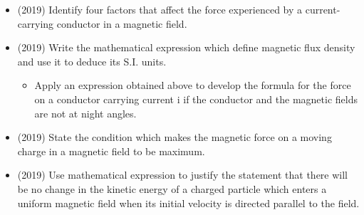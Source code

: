 \documentclass{article}
\begin{document}
\begin{itemize}
\begin{itemize}
\end{itemize}
\item (2019)  Identify four factors that affect the force experienced by a current-carrying conductor in a magnetic field. 
\item (2019)  Write the mathematical expression which define magnetic flux density and use it to deduce its S.I. units. 
 \begin{itemize}
\item Apply an expression obtained above to develop the formula for the force on a conductor carrying current i if the conductor and the magnetic fields are not at night angles.
\end{itemize}
\item (2019)  State the condition which makes the magnetic force on a moving charge in a magnetic field to be maximum. 
\item (2019)  Use mathematical expression to justify the statement that there will be no change in the kinetic energy of a charged particle which enters a uniform magnetic field when its initial velocity is directed parallel to the field.
\end{itemize}
\end{document}
